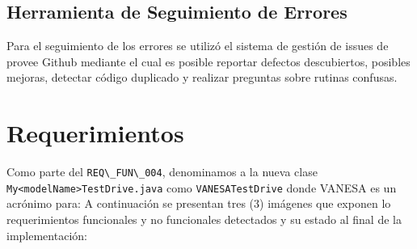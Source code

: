 \documentclass[10pt]{article} %
\newcommand{\comillas}[1]{``#1''}
\begin{document}
\subsection{Herramienta de Seguimiento de Errores}
Para el seguimiento de los errores se utilizó el sistema de gestión de issues de provee Github mediante el cual es posible reportar defectos descubiertos, posibles mejoras, detectar código duplicado y realizar preguntas sobre rutinas confusas.



\section{Requerimientos}
Como parte del \verb+REQ\_FUN\_004+, denominamos a la nueva clase
\verb+My<modelName>TestDrive.java+ como \verb+VANESATestDrive+
donde VANESA es un acrónimo para: %
A continuación se presentan tres (3) imágenes que exponen lo requerimientos funcionales y no funcionales detectados y su estado al final de la implementación:

\begin{figure}[H] %
\label{fig:Diagrama_de_Requerimientos1a}
\end{figure}
\end{document}
